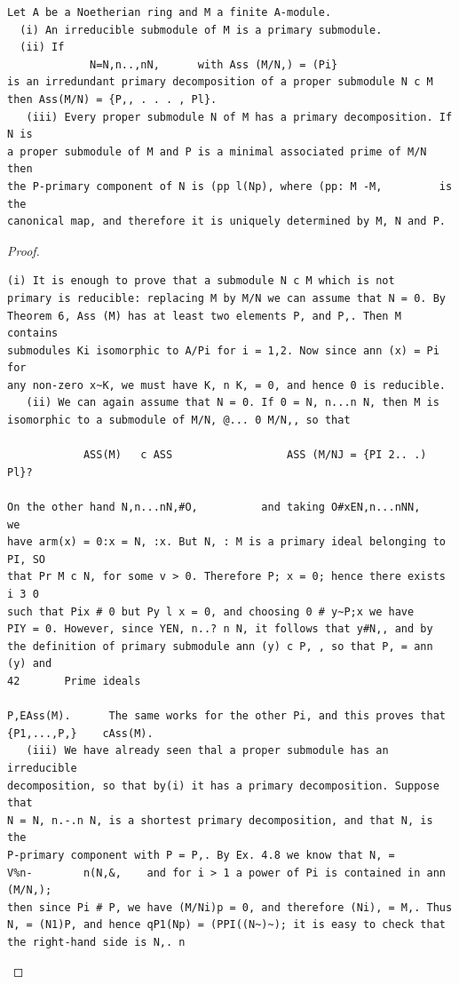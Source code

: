\begin{theorem}\label{mcrt-auto-theorem-6-8}\uses{}
\begin{verbatim}
Let A be a Noetherian ring and M a finite A-module.
  (i) An irreducible submodule of M is a primary submodule.
  (ii) If
             N=N,n..,nN,      with Ass (M/N,) = (Pi}
is an irredundant primary decomposition of a proper submodule N c M
then Ass(M/N) = {P,, . . . , Pl}.
   (iii) Every proper submodule N of M has a primary decomposition. If N is
a proper submodule of M and P is a minimal associated prime of M/N then
the P-primary component of N is (pp l(Np), where (pp: M -M,         is the
canonical map, and therefore it is uniquely determined by M, N and P.
\end{verbatim}
\end{theorem}
\begin{proof}
\begin{verbatim}
(i) It is enough to prove that a submodule N c M which is not
primary is reducible: replacing M by M/N we can assume that N = 0. By
Theorem 6, Ass (M) has at least two elements P, and P,. Then M contains
submodules Ki isomorphic to A/Pi for i = 1,2. Now since ann (x) = Pi for
any non-zero x~K, we must have K, n K, = 0, and hence 0 is reducible.
   (ii) We can again assume that N = 0. If 0 = N, n...n N, then M is
isomorphic to a submodule of M/N, @... 0 M/N,, so that

            ASS(M)   c ASS                  ASS (M/NJ = {PI 2.. .) Pl}?

On the other hand N,n...nN,#O,          and taking O#xEN,n...nNN,        we
have arm(x) = 0:x = N, :x. But N, : M is a primary ideal belonging to PI, SO
that Pr M c N, for some v > 0. Therefore P; x = 0; hence there exists i 3 0
such that Pix # 0 but Py l x = 0, and choosing 0 # y~P;x we have
PIY = 0. However, since YEN, n..? n N, it follows that y#N,, and by
the definition of primary submodule ann (y) c P, , so that P, = ann (y) and
42       Prime ideals

P,EAss(M).      The same works for the other Pi, and this proves that
{P1,...,P,}    cAss(M).
   (iii) We have already seen thal a proper submodule has an irreducible
decomposition, so that by(i) it has a primary decomposition. Suppose that
N = N, n.-.n N, is a shortest primary decomposition, and that N, is the
P-primary component with P = P,. By Ex. 4.8 we know that N, =
V%n-        n(N,&,    and for i > 1 a power of Pi is contained in ann (M/N,);
then since Pi # P, we have (M/Ni)p = 0, and therefore (Ni), = M,. Thus
N, = (N1)P, and hence qP1(Np) = (PPI((N~)~); it is easy to check that
the right-hand side is N,. n
\end{verbatim}
\end{proof}


